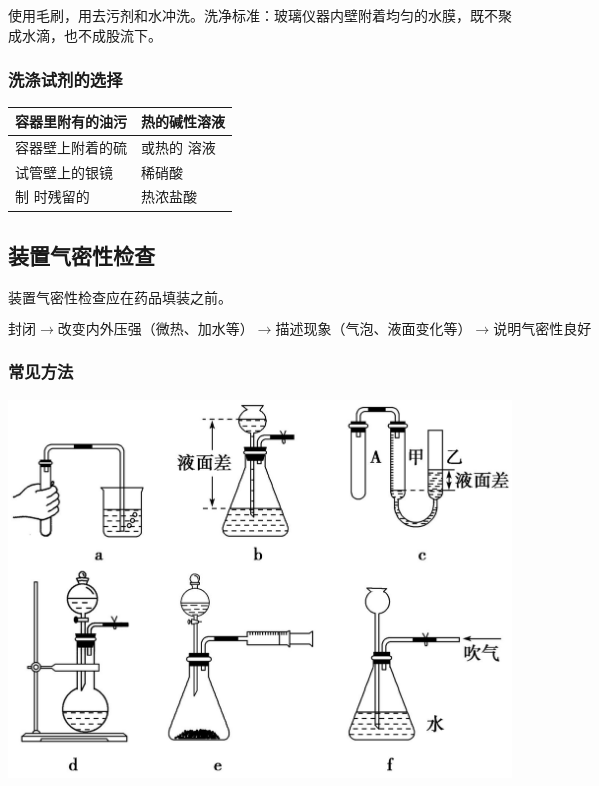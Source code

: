 \documentclass[10pt]{article}
\begin{document}
	使用毛刷，用去污剂和水冲洗。洗净标准：玻璃仪器内壁附着均匀的水膜，既不聚成水滴，也不成股流下。
	
	\subsubsection{洗涤试剂的选择}
	
	\begin{center}
	\tablelasttail{\hline}
	\begin{supertabular}{|m{0.5\textwidth}<{ \centering}|m{0.5\textwidth}<{ \centering}|}
		\hline
		容器里附有的油污 & 热的碱性溶液 \\ \hline
		容器壁上附着的硫 & 或热的 溶液 \\ \hline
		试管壁上的银镜 & 稀硝酸 \\ \hline
		制 时残留的  & 热浓盐酸 \\
	\end{supertabular}
	\end{center}
	
	\subsection{装置气密性检查}
	
	装置气密性检查应在药品填装之前。

	$$
	\text{封闭}\rightarrow\text{改变内外压强（微热、加水等）}\rightarrow\text{描述现象（气泡、液面变化等）}\rightarrow\text{说明气密性良好}
	$$
	
	\subsubsection{常见方法}
	
	\begin{center}
		\includegraphics[scale=0.13]{res/airtight}
	\end{center}
		
\end{document}
